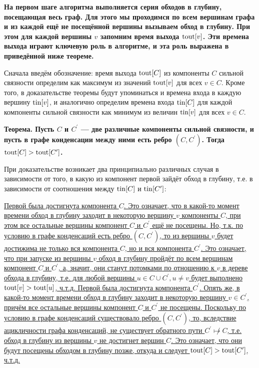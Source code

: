 \bf{На первом шаге} алгоритма выполняется серия обходов в глубину, посещающая весь граф. Для этого мы проходимся по всем вершинам графа и из каждой ещё не посещённой вершины вызываем обход в глубину. При этом для каждой вершины $v$ запомним \bf{время выхода} ${\rm tout}[v]$. Эти времена выхода играют ключевую роль в алгоритме, и эта роль выражена в приведённой ниже теореме.

Сначала введём обозначение: время выхода ${\rm tout}[C]$ из компоненты $C$ сильной связности определим как максимум из значений ${\rm tout}[v]$ для всех $v \in C$. Кроме того, в доказательстве теоремы будут упоминаться и времена входа в каждую вершину ${\rm tin}[v]$, и аналогично определим времена входа ${\rm tin}[C]$ для каждой компоненты сильной связности как минимум из величин ${\rm tin}[v]$ для всех $v \in C$.

\bf{Теорема}. Пусть $C$ и $C^\prime$ --- две различные компоненты сильной связности, и пусть в графе конденсации между ними есть ребро $(C,C^\prime)$. Тогда ${\rm tout}[C] > {\rm tout}[C^\prime]$.

При доказательстве возникает два принципиально различных случая в зависимости от того, в какую из компонент первой зайдёт обход в глубину, т.е. в зависимости от соотношения между ${\rm tin}[C]$ и ${\rm tin}[C^\prime]$:

\ul{
\li Первой была достигнута компонента $C$. Это означает, что в какой-то момент времени обход в глубину заходит в некоторую вершину $v$ компоненты $C$, при этом все остальные вершины компонент $C$ и $C^\prime$ ещё не посещены. Но, т.к. по условию в графе конденсаций есть ребро $(C,C^\prime)$, то из вершины $v$ будет достижима не только вся компонента $C$, но и вся компонента $C^\prime$. Это означает, что при запуске из вершины $v$ обход в глубину пройдёт по всем вершинам компонент $C$ и $C^\prime$, а, значит, они станут потомками по отношению к $v$ в дереве обхода в глубину, т.е. для любой вершины $u \in C \cup C^\prime, u \ne v$ будет выполнено ${\rm tout}[v] > {\rm tout}[u]$, ч.т.д.
\li Первой была достигнута компонента $C^\prime$. Опять же, в какой-то момент времени обход в глубину заходит в некоторую вершину $v \in C^\prime$, причём все остальные вершины компонент $C$ и $C^\prime$ не посещены. Поскольку по условию в графе конденсаций существовало ребро $(C,C^\prime)$, то, вследствие ацикличности графа конденсаций, не существует обратного пути $C^\prime \not\mapsto C$, т.е. обход в глубину из вершины $v$ не достигнет вершин $C$. Это означает, что они будут посещены обходом в глубину позже, откуда и следует ${\rm tout}[C] > {\rm tout}[C^\prime]$, ч.т.д.
}

